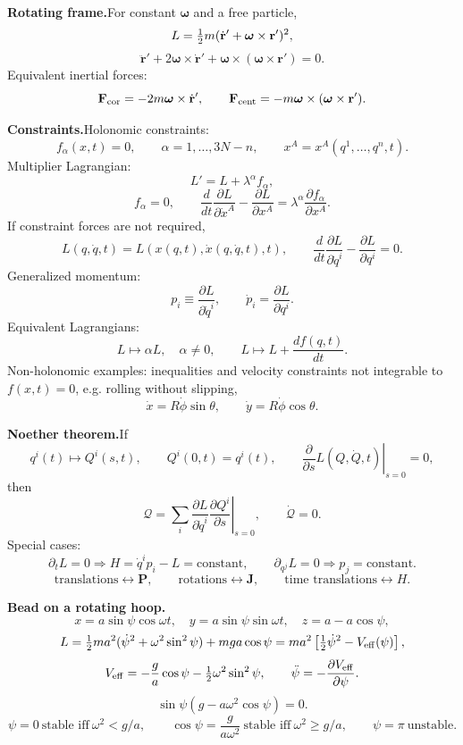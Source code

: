 \noindent\textbf{Rotating frame.}\quad For constant $\bm\omega$ and a free particle,
\[
L=\tfrac{1}{2} m(\dot{\mathbf r}'+\bm\omega\times\mathbf r')^2,
\]
\[
\boxed{\ddot{\mathbf r}'
+2\bm\omega\times\dot{\mathbf r}'
+\bm\omega\times(\bm\omega\times\mathbf r')=0}.
\]
Equivalent inertial forces:
\[
\mathbf F_{\rm cor}=-2m\bm\omega\times\dot{\mathbf r}',
\qquad
\mathbf F_{\rm cent}=-m\bm\omega\times(\bm\omega\times\mathbf r').
\]

\noindent\textbf{Constraints.}\quad Holonomic constraints:
\[
f_\alpha(x,t)=0,\qquad \alpha=1,\ldots,3N-n,
\qquad x^A=x^A(q^1,\ldots,q^n,t).
\]
Multiplier Lagrangian:
\[
L'=L+\lambda^\alpha f_\alpha,
\]
\[
f_\alpha=0,\qquad
\frac{d}{dt}\frac{\partial L}{\partial\dot x^A}
-\frac{\partial L}{\partial x^A}
=\lambda^\alpha\frac{\partial f_\alpha}{\partial x^A}.
\]
If constraint forces are not required,
\[
\boxed{
L(q,\dot q,t)=L(x(q,t),\dot x(q,\dot q,t),t),\qquad
\frac{d}{dt}\frac{\partial L}{\partial\dot q^i}
-\frac{\partial L}{\partial q^i}=0}.
\]
Generalized momentum:
\[
p_i\equiv\frac{\partial L}{\partial\dot q^i},\qquad
\dot p_i=\frac{\partial L}{\partial q^i}.
\]
Equivalent Lagrangians:
\[
L\mapsto \alpha L,\quad \alpha\ne0,\qquad
L\mapsto L+\frac{df(q,t)}{dt}.
\]
Non-holonomic examples: inequalities and velocity constraints not integrable to
$f(x,t)=0$, e.g. rolling without slipping,
\[
\dot x=R\dot\phi\sin\theta,\qquad
\dot y=R\dot\phi\cos\theta.
\]

\noindent\textbf{Noether theorem.}\quad If
\[
q^i(t)\mapsto Q^i(s,t),\qquad Q^i(0,t)=q^i(t),
\qquad
\left.\frac{\partial}{\partial s}L(Q,\dot Q,t)\right|_{s=0}=0,
\]
then
\[
\boxed{
\mathcal Q=\sum_i
\frac{\partial L}{\partial\dot q^i}
\left.\frac{\partial Q^i}{\partial s}\right|_{s=0},
\qquad \dot{\mathcal Q}=0}.
\]
Special cases:
\[
\partial_tL=0
\Rightarrow
H=\dot q^ip_i-L=\text{constant},
\qquad
\partial_{q^j}L=0
\Rightarrow
p_j=\text{constant}.
\]
\[
\text{translations}\leftrightarrow\mathbf P,\qquad
\text{rotations}\leftrightarrow\mathbf J,\qquad
\text{time translations}\leftrightarrow H.
\]

\noindent\textbf{Bead on a rotating hoop.}\quad
\[
x=a\sin\psi\cos\omega t,\quad
y=a\sin\psi\sin\omega t,\quad
z=a-a\cos\psi,
\]
\[
L=\tfrac{1}{2} ma^2(\dot\psi^2+\omega^2\sin^2\psi)+mga\cos\psi
=ma^2\left[\tfrac{1}{2}\dot\psi^2-V_{\rm eff}(\psi)\right],
\]
\[
V_{\rm eff}=-\frac{g}{a}\cos\psi-\tfrac{1}{2}\omega^2\sin^2\psi,\qquad
\ddot\psi=-\frac{\partial V_{\rm eff}}{\partial\psi}.
\]
\[
\sin\psi(g-a\omega^2\cos\psi)=0.
\]
\[
\psi=0\ \text{stable iff}\ \omega^2<g/a,\qquad
\cos\psi=\frac{g}{a\omega^2}\ \text{stable iff}\ \omega^2\ge g/a,\qquad
\psi=\pi\ \text{unstable}.
\]

